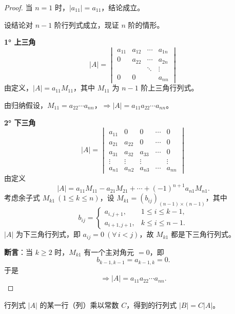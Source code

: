 \begin{proof}
当 $n=1$ 时，$|a_{11}|=a_{11}$，结论成立。

设结论对 $n-1$ 阶行列式成立，现证 $n$ 阶的情形。

\textbf{1° 上三角}
\[
|A|=\begin{vmatrix}
a_{11} & a_{12} & \cdots & a_{1n}\\
0 & a_{22} & \cdots & a_{2n}\\
 & & \ddots & \vdots\\
0 & 0 & & a_{nn}
\end{vmatrix}
\]
由定义，$|A|=a_{11}M_{11}$，其中 $M_{11}$ 为 $n-1$ 阶上三角行列式。

由归纳假设，$M_{11}=a_{22}\cdots a_{nn}$，$\Rightarrow |A|=a_{11}a_{22}\cdots a_{nn}$。


\textbf{2° 下三角}
\[
|A|=\begin{vmatrix}
a_{11} & 0 & 0 & \cdots & 0\\
a_{21} & a_{22} & 0 & \cdots & 0\\
a_{31} & a_{32} & a_{33} & \cdots & 0\\
\vdots & \vdots & \vdots & & \vdots\\
a_{n1} & a_{n2} & a_{n3} & \cdots & a_{nn}
\end{vmatrix}
\]
由定义
\[
|A|=a_{11}M_{11}-a_{21}M_{21}+\cdots+(-1)^{n+1}a_{n1}M_{n1}.
\]
考虑余子式 $M_{k1}\ (1\le k\le n)$，设 $M_{k1}=(b_{ij})_{(n-1)\times(n-1)}$，其中
\[
b_{ij}=
\begin{cases}
a_{i,j+1}, & 1\le i\le k-1,\\
a_{i+1,j+1}, & k\le i\le n-1.
\end{cases}
\]
$|A|$ 为下三角行列式，即 $a_{ij}=0\ (\forall\,i<j)$，故 $M_{k1}$ 都是下三角行列式。

\textbf{断言}：当 $k\ge 2$ 时，$M_{k1}$ 有一个主对角元 $=0$，即
\[
b_{k-1,k-1}=a_{k-1,k}=0.
\]
于是
\[
\Rightarrow |A|=a_{11}a_{22}\cdots a_{nn}.
\]
\end{proof}

\begin{proposition}[性质 3]
行列式 $|A|$ 的某一行（列）乘以常数 $C$，得到的行列式 $|B|=C|A|$。
\end{proposition}

